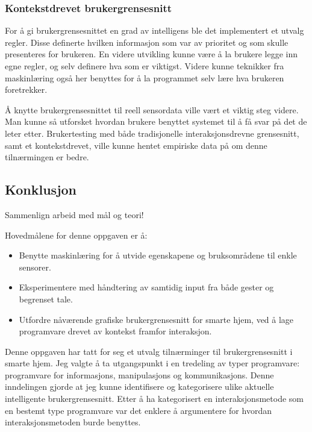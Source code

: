 \subsubsection*{Kontekstdrevet brukergrensesnitt}
For å gi brukergrensesnittet en grad av intelligens ble det implementert et utvalg regler. Disse definerte hvilken informasjon som var av prioritet og som skulle presenteres for brukeren. En videre utvikling kunne være å la brukere legge inn egne regler, og selv definere hva som er viktigst. Videre kunne teknikker fra maskinlæring også her benyttes for å la programmet selv lære hva brukeren foretrekker. 

Å knytte brukergrensesnittet til reell sensordata ville vært et viktig steg videre. Man kunne så utforsket hvordan brukere benyttet systemet til å få svar på det de leter etter. Brukertesting med både tradisjonelle interaksjonsdrevne grensesnitt, samt et kontekstdrevet, ville kunne hentet empiriske data på om denne tilnærmingen er bedre.

\subsection{Konklusjon}
{\color{red}Sammenlign arbeid med mål og teori!}\newline
{\color{blue}Hovedmålene for denne oppgaven er å:
\begin{itemize}
\item Benytte maskinlæring for å utvide egenskapene og bruksområdene til enkle sensorer.
\item Eksperimentere med håndtering av samtidig input fra både gester og begrenset tale.
\item Utfordre nåværende grafiske brukergrensesnitt for smarte hjem, ved å lage programvare drevet av kontekst framfor interaksjon.
\end{itemize}}

Denne oppgaven har tatt for seg et utvalg tilnærminger til brukergrensesnitt i smarte hjem. Jeg valgte å ta utgangspunkt i en tredeling av typer programvare: programvare for informasjons, manipulasjons og kommunikasjons. Denne inndelingen gjorde at jeg kunne identifisere og kategorisere ulike aktuelle intelligente brukergrensesnitt. Etter å ha kategorisert en interaksjonsmetode som en bestemt type programvare var det enklere å argumentere for hvordan interaksjonsmetoden burde benyttes.


